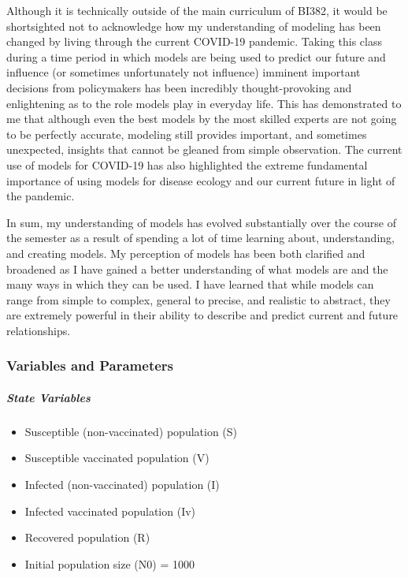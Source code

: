 \documentclass[]{article}
\providecommand{\tightlist}{%
  \setlength{\itemsep}{0pt}\setlength{\parskip}{0pt}}
\let\oldsubparagraph\subparagraph
\renewcommand{\subparagraph}[1]{\oldsubparagraph{#1}\mbox{}}
\begin{document}
Although it is technically outside of the main curriculum of BI382, it
would be shortsighted not to acknowledge how my understanding of
modeling has been changed by living through the current COVID-19
pandemic. Taking this class during a time period in which models are
being used to predict our future and influence (or sometimes
unfortunately not influence) imminent important decisions from
policymakers has been incredibly thought-provoking and enlightening as
to the role models play in everyday life. This has demonstrated to me
that although even the best models by the most skilled experts are not
going to be perfectly accurate, modeling still provides important, and
sometimes unexpected, insights that cannot be gleaned from simple
observation. The current use of models for COVID-19 has also highlighted
the extreme fundamental importance of using models for disease ecology
and our current future in light of the pandemic.

In sum, my understanding of models has evolved substantially over the
course of the semester as a result of spending a lot of time learning
about, understanding, and creating models. My perception of models has
been both clarified and broadened as I have gained a better
understanding of what models are and the many ways in which they can be
used. I have learned that while models can range from simple to complex,
general to precise, and realistic to abstract, they are extremely
powerful in their ability to describe and predict current and future
relationships.

\hypertarget{variables-and-parameters}{%
\subsubsection{Variables and
Parameters}\label{variables-and-parameters}}

\hypertarget{state-variables}{%
\subparagraph{State Variables}\label{state-variables}}

\begin{itemize}
\tightlist
\item
  Susceptible (non-vaccinated) population (S)
\item
  Susceptible vaccinated population (V)
\item
  Infected (non-vaccinated) population (I)
\item
  Infected vaccinated population (Iv)
\item
  Recovered population (R)
\item
  Initial population size (N0) = 1000
\end{itemize}
\end{document}
